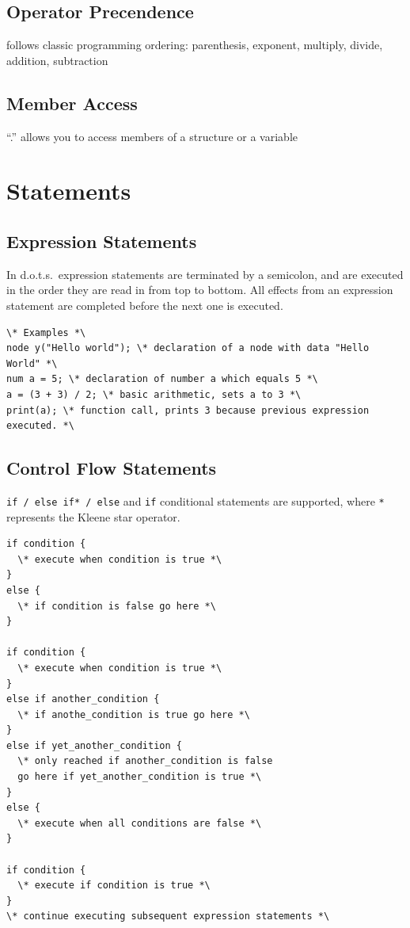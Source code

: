 \documentclass{article}
\newcommand{\pltlang}{d.o.t.s.} %
\newcommand{\code}[1]{\texttt{#1}} %
\begin{document}
\subsection{Operator Precendence}
follows classic programming ordering: parenthesis, exponent, multiply, divide, addition, subtraction
\subsection{Member Access}

 ``.'' allows you to access members of a structure or a variable


\section{Statements}

\subsection{Expression Statements}
In \pltlang\ expression statements are terminated by a semicolon, and are executed in the order they are read in from top to bottom. All effects from an expression statement are completed before the next one is executed.

\begin{lstlisting}[language=pltLang, label=lst:expression-statements]
\* Examples *\
node y("Hello world"); \* declaration of a node with data "Hello World" *\
num a = 5; \* declaration of number a which equals 5 *\
a = (3 + 3) / 2; \* basic arithmetic, sets a to 3 *\
print(a); \* function call, prints 3 because previous expression executed. *\

\end{lstlisting}

\subsection{Control Flow Statements}
\code{if / else if* / else} and \code{if} conditional statements are supported, where \code{*} represents the Kleene star operator.

\begin{lstlisting}[language=pltLang, label=lst:if-else]
if condition {
  \* execute when condition is true *\
}
else {
  \* if condition is false go here *\
}

if condition {
  \* execute when condition is true *\
}
else if another_condition {
  \* if anothe_condition is true go here *\
}
else if yet_another_condition {
  \* only reached if another_condition is false
  go here if yet_another_condition is true *\
}
else {
  \* execute when all conditions are false *\
}

if condition {
  \* execute if condition is true *\
}
\* continue executing subsequent expression statements *\

\end{lstlisting}
\end{document}
